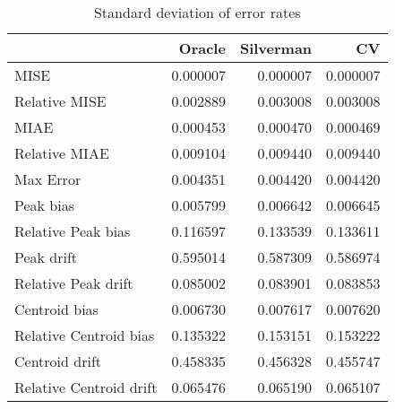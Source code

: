 \begin{table}[ht]
\centering
\begin{tabular}{lrrr}
  \hline
 & Oracle & Silverman & CV \\ 
  \hline
MISE & 0.000007 & 0.000007 & 0.000007 \\ 
  Relative MISE & 0.002889 & 0.003008 & 0.003008 \\ 
  MIAE & 0.000453 & 0.000470 & 0.000469 \\ 
  Relative MIAE & 0.009104 & 0.009440 & 0.009440 \\ 
  Max Error & 0.004351 & 0.004420 & 0.004420 \\ 
  Peak bias & 0.005799 & 0.006642 & 0.006645 \\ 
  Relative Peak bias & 0.116597 & 0.133539 & 0.133611 \\ 
  Peak drift & 0.595014 & 0.587309 & 0.586974 \\ 
  Relative Peak drift & 0.085002 & 0.083901 & 0.083853 \\ 
  Centroid bias & 0.006730 & 0.007617 & 0.007620 \\ 
  Relative Centroid bias & 0.135322 & 0.153151 & 0.153222 \\ 
  Centroid drift & 0.458335 & 0.456328 & 0.455747 \\ 
  Relative Centroid drift & 0.065476 & 0.065190 & 0.065107 \\ 
   \hline
\end{tabular}
\caption{Standard deviation of error rates} 
\label{tbl:stddev_error_rates}
\end{table}
